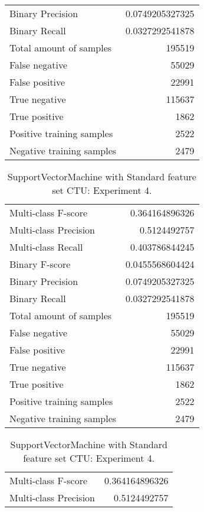 \begin{table}[H]
\begin{minipage}{0.5\textwidth}
\begin{tabular}{l r}
Binary Precision & 0.0749205327325 \\
Binary Recall & 0.0327292541878 \\
\midrule
Total amount of samples & 195519 \\
False negative & 55029 \\
False positive & 22991 \\
True negative & 115637 \\
True positive & 1862 \\
\midrule
Positive training samples & 2522 \\
Negative training samples & 2479 \\
\bottomrule
\end{tabular}
\end{minipage}
\end{table}
\begin{table}[H]
\begin{minipage}{0.5\textwidth}
\caption{SupportVectorMachine with Standard feature set CTU: Experiment 3.}
\centering
\begin{tabular}{l r}
\toprule
Multi-class F-score & 0.364164896326 \\
Multi-class Precision & 0.5124492757 \\
Multi-class Recall & 0.403786844245 \\
\midrule
Binary F-score & 0.0455568604424 \\
Binary Precision & 0.0749205327325 \\
Binary Recall & 0.0327292541878 \\
\midrule
Total amount of samples & 195519 \\
False negative & 55029 \\
False positive & 22991 \\
True negative & 115637 \\
True positive & 1862 \\
\midrule
Positive training samples & 2522 \\
Negative training samples & 2479 \\
\bottomrule
\end{tabular}
\end{minipage}
\hfillx
\begin{minipage}{0.5\textwidth}
\caption{SupportVectorMachine with Standard feature set CTU: Experiment 4.}
\centering
\begin{tabular}{l r}
\toprule
Multi-class F-score & 0.364164896326 \\
Multi-class Precision & 0.5124492757 \\

\end{tabular}
\end{minipage}
\end{table}
